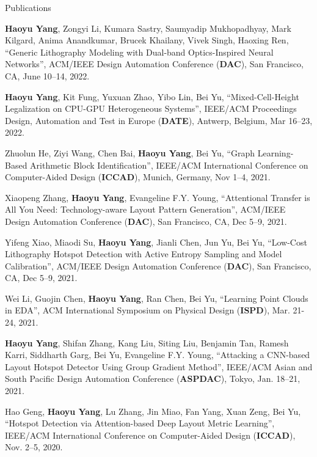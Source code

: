 \begin{rSection}{Publications}
\begin{description}[font=\normalfont]
	\item[{[C24]}] \textbf{Haoyu Yang}, Zongyi Li, Kumara Sastry, Saumyadip Mukhopadhyay, Mark Kilgard, Anima Anandkumar, Brucek Khailany, Vivek Singh, Haoxing Ren,
	``Generic Lithography Modeling with Dual-band Optics-Inspired Neural Networks'',
	ACM/IEEE Design Automation Conference (\textbf{DAC}), San Francisco, CA, June 10–14, 2022.
	
	\item[{[C23]}] \textbf{Haoyu Yang}, Kit Fung, Yuxuan Zhao, Yibo Lin, Bei Yu,
	``Mixed-Cell-Height Legalization on CPU-GPU Heterogeneous Systems'',
	IEEE/ACM Proceedings Design, Automation and Test in Europe (\textbf{DATE}), Antwerp, Belgium, Mar 16–23, 2022.
	
	\item[{[C22]}] Zhuolun He, Ziyi Wang, Chen Bai, \textbf{Haoyu Yang}, Bei Yu, ``Graph Learning-Based Arithmetic Block Identification'',
	IEEE/ACM International Conference on Computer-Aided Design (\textbf{ICCAD}), Munich, Germany, Nov 1–4, 2021.
	
	\item[{[C21]}] Xiaopeng Zhang, \textbf{Haoyu Yang}, Evangeline F.Y. Young, ``Attentional Transfer is All You Need: Technology-aware Layout Pattern Generation'',
	ACM/IEEE Design Automation Conference (\textbf{DAC}), San Francisco, CA, Dec 5–9, 2021.
	
	
	\item[{[C20]}] Yifeng Xiao, Miaodi Su, \textbf{Haoyu Yang}, Jianli Chen, Jun Yu, Bei Yu,
	``Low-Cost Lithography Hotspot Detection with Active Entropy Sampling and Model Calibration'',
	ACM/IEEE Design Automation Conference (\textbf{DAC}), San Francisco, CA, Dec 5–9, 2021.
	
	\item[{[C19]}] Wei Li, Guojin Chen, \textbf{Haoyu Yang}, Ran Chen, Bei Yu,
	``Learning Point Clouds in EDA'', ACM International Symposium on Physical Design (\textbf{ISPD}), Mar. 21-24, 2021.

	\item[{[C18]}] \textbf{Haoyu Yang}, Shifan Zhang, Kang Liu, Siting Liu, Benjamin Tan, Ramesh Karri, Siddharth Garg, Bei Yu, Evangeline F.Y. Young,
	``Attacking a CNN-based Layout Hotspot Detector Using Group Gradient Method'', 
	IEEE/ACM Asian and South Pacific Design Automation Conference (\textbf{ASPDAC}), Tokyo, Jan. 18–21, 2021.

    \item[{[C17]}] Hao Geng, \textbf{Haoyu Yang}, Lu Zhang, Jin Miao, Fan Yang, Xuan Zeng, Bei Yu, 
    ``Hotspot Detection via Attention-based Deep Layout Metric Learning'', 
    IEEE/ACM International Conference on Computer-Aided Design (\textbf{ICCAD}), Nov. 2–5, 2020.
    

\end{description}
\end{rSection}
